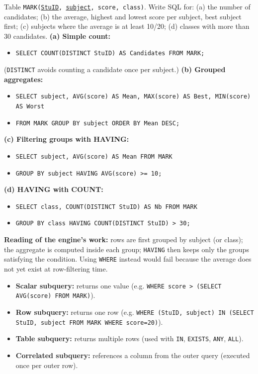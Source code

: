 \documentclass[11pt]{article}
\begin{document}
\begin{exoresolu}
Table \texttt{MARK(\underline{StuID}, \underline{subject}, score, class)}. Write SQL for: (a) the number of candidates; (b) the average, highest and lowest score per subject, best subject first; (c) subjects where the average is at least 10/20; (d) classes with more than 30 candidates.
\tcblower
\textbf{(a) Simple count:}
\begin{itemize}
\item[] \texttt{SELECT COUNT(DISTINCT StuID) AS Candidates FROM MARK;}
\end{itemize}
(\texttt{DISTINCT} avoids counting a candidate once per subject.)
\textbf{(b) Grouped aggregates:}
\begin{itemize}
\item[] \texttt{SELECT subject, AVG(score) AS Mean, MAX(score) AS Best, MIN(score) AS Worst}
\item[] \texttt{FROM MARK GROUP BY subject ORDER BY Mean DESC;}
\end{itemize}
\textbf{(c) Filtering groups with HAVING:}
\begin{itemize}
\item[] \texttt{SELECT subject, AVG(score) AS Mean FROM MARK}
\item[] \texttt{GROUP BY subject HAVING AVG(score) >= 10;}
\end{itemize}
\textbf{(d) HAVING with COUNT:}
\begin{itemize}
\item[] \texttt{SELECT class, COUNT(DISTINCT StuID) AS Nb FROM MARK}
\item[] \texttt{GROUP BY class HAVING COUNT(DISTINCT StuID) > 30;}
\end{itemize}
\textbf{Reading of the engine's work:} rows are first grouped by subject (or class); the aggregate is computed inside each group; \texttt{HAVING} then keeps only the groups satisfying the condition. Using \texttt{WHERE} instead would fail because the average does not yet exist at row-filtering time.
\end{exoresolu}

\begin{aretenir}[Subqueries]
\begin{itemize}
\item \textbf{Scalar subquery:} returns one value (e.g. \texttt{WHERE score > (SELECT AVG(score) FROM MARK)}).
\item \textbf{Row subquery:} returns one row (e.g. \texttt{WHERE (StuID, subject) IN (SELECT StuID, subject FROM MARK WHERE score=20)}).
\item \textbf{Table subquery:} returns multiple rows (used with \texttt{IN}, \texttt{EXISTS}, \texttt{ANY}, \texttt{ALL}).
\item \textbf{Correlated subquery:} references a column from the outer query (executed once per outer row).
\end{itemize}
\end{aretenir}
\end{document}

